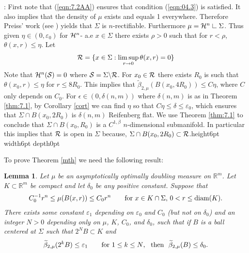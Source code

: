 \documentclass[12pt,leqno]{article}
\newcommand\qed{\hfill\vrule height6pt width6pt depth0pt}
\newcommand{\diam}{{\rm diam}}
\newcommand{\wt}[1]{{\widetilde{#1}}}
\newcommand{\res}{\hbox{ {\vrule height .22cm}{\leaders\hrule\hskip.2cm} } }
\newcommand{\RR}{\mathbb{R}}
\newcommand{\ve}{{\varepsilon}}
\theoremstyle{plain}
\newtheorem{lem}[thm]{Lemma}
\numberwithin{equation}{section}
\begin{document}
:
First note that (\ref{eqn:7.2AA}) ensures that condition
(\ref{eqn:04.3}) is satisfied. It also implies
that the density of $\mu$
exists and equals 1 everywhere. Therefore Preiss' work (see \cite{Pr})
yields that $\Sigma$ is $n$-rectifiable. Furthermore
$\mu={\cal H}^n\res\Sigma$. Thus given $\eta\in (0, \ve_0)$
for ${\cal H}^n$- a.e
$x\in \Sigma$ there
exists $\rho>0$ such that for $r<\rho$, $\theta(x,r)\le \eta$.
Let
\begin{equation}\label{defnr}
{\cal R}=\{x\in \Sigma:\limsup_{r\rightarrow 0}\theta(x,r)=0\}
\end{equation}
Note that ${\cal H}^n({\cal S})=0$ where ${\cal S}=\Sigma\backslash {\cal R}$.
For $x_0\in {\cal R}$ there exists
$R_0$ is such that $\theta(x_0, r)\le \eta$
for $r\le 8R_0$. This implies that
$\wt\beta_{2,\mu}(B(x_0, 4R_0))\leq C\eta$, where $C$ only depends on $C_0$.
For $\epsilon\in (0,\delta(n,m))$ where $\delta(n,m)$ is as in Theorem
\ref{thm:7.1}, by Corollary \ref{cort} we can find $\eta$ so that
$C\eta\le \delta\le \ve_0$, which ensures that $\Sigma\cap B(x_0, 2R_0)$ is
$\delta(n,m)$ Reifenberg flat. We use Theorem \ref{thm:7.1} to conclude
that $\Sigma\cap B(x_0, R_0)$ is a $C^{1,\beta}$ $n$-dimensional submanifold.
In particular this implies that ${\cal R}$ is open in $\Sigma$ because,
$\Sigma\cap B(x_0, 2R_0)\subset {\cal R}$.\qed


To prove Theorem \ref{mth} we need the following result:


\begin{lem} \label{mlem}
Let $\mu$ be an asymptotically optimally doubling measure on $\RR^m$.
Let $K\subset\RR^m$ be compact and let $\delta_0$ be any positive
constant. Suppose that
$$C_0^{-1}r^n\leq \mu(B(x,r))\leq C_0r^n\qquad\mbox{for $x\in
K\cap\Sigma$, $0<r\leq\diam(K)$}.$$
 There exists some constant
$\ve_1$ depending on $\ve_0$ and $C_0$ (but not on $\delta_0$) and
an integer $N>0$ depending only on $\mu$, $K$, $C_0$, and
$\delta_0$, such that if $B$ is a ball centered at $\Sigma$ such
that $2^NB\subset K$ and
\begin{equation}\label{eqn:ml}
\wt\beta_{2,\mu}(2^kB)\leq \ve_1\qquad \mbox{for $1\leq k\leq N$},\ \
\hbox{then}\ \  \wt\beta_{2,\mu}(B)\leq\delta_0.
\end{equation}
\end{lem}
\end{document}
